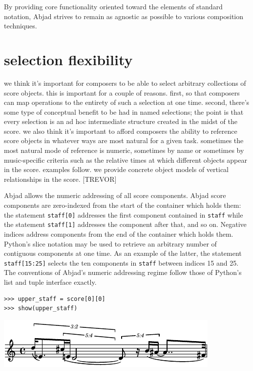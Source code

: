 \documentclass{article}
\begin{document}
\hrulefill\vspace{5pt}

By providing core functionality oriented toward the elements of standard
notation, Abjad strives to remain as agnostic as possible to various
composition techniques. 

\section{selection flexibility}

we think it's important for composers to be able to select arbitrary
collections of score objects. this is important for a couple of reasons. first,
so that composers can map operations to the entirety of such a selection at one
time. second, there's some type of conceptual benefit to be had in named
selections; the point is that every selection is an ad hoc intermediate
structure created in the midst of the score. we also think it's important to
afford composers the ability to reference score objects in whatever ways are
most natural for a given task. sometimes the most natural mode of reference is
numeric, sometimes by name or sometimes by music-specific criteria such as the
relative times at which different objects appear in the score. examples follow.
we provide concrete object models of vertical relationships in the score.
[TREVOR]

\hrulefill\vspace{5pt}

Abjad allows the numeric addressing of all score components. Abjad score
components are zero-indexed from the start of the container which holds them:
the statement \texttt{staff[0]} addresses the first component contained in
\texttt{staff} while the statement \texttt{staff[1]} addresses the component
after that, and so on. Negative indices address components from the end of the
container which holds them. Python's slice notation may be used to retrieve an
arbitrary number of contiguous components at one time. As an example of the
latter, the statement \texttt{staff[15:25]} selects the ten components in
\texttt{staff} between indices 15 and 25. The conventions of Abjad's numeric
addressing regime follow those of Python's list and tuple interface exactly. 

\begin{lstlisting}
>>> upper_staff = score[0][0]
>>> show(upper_staff)
\end{lstlisting}

\includegraphics[scale=1.0]{images/abjad-3.pdf}
\end{document}
